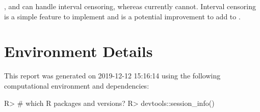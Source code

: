 \documentclass[
]{jss}
\begin{document}
,  and  can handle interval
censoring, whereas  currently cannot. Interval censoring
is a simple feature to implement and is a potential improvement to add
to .

\hypertarget{environment-details}{%
\section{Environment Details}\label{environment-details}}

This report was generated on 2019-12-12 15:16:14 using the following
computational environment and dependencies:

\begin{CodeChunk}

\begin{CodeInput}
R> # which R packages and versions?
R> devtools::session_info()
\end{CodeInput}


\end{CodeChunk}
\end{document}
